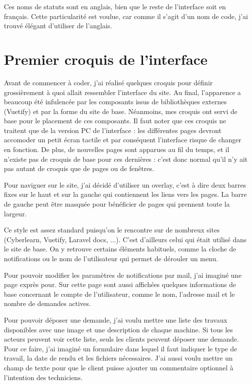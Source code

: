 \documentclass[
    iai, %
    eai, %
]{heig-tb}
\begin{document}
Ces noms de statuts sont en anglais, bien que le reste de l'interface soit en français.
Cette particularité est voulue, car comme il s'agit d'un nom de code, j'ai trouvé élégant d'utiliser de l'anglais.

\newpage
\section{Premier croquis de l'interface}
Avant de commencer à coder, j'ai réalisé quelques croquis pour définir grossièrement à quoi allait ressembler l'interface du site.
Au final, l'apparence a beaucoup été infulencée par les composants issus de bibliothèques externes (Vuetify) et par la forme du site de base.
Néanmoins, mes croquis ont servi de base pour le placement de ces composants.
Il faut noter que ces croquis ne traitent que de la version PC de l'interface : les différentes pages devront accomoder un petit écran tactile et par conséquent l'interface risque de changer en fonction.
De plus, de nouvelles pages sont apparues au fil du temps, et il n'existe pas de croquis de base pour ces dernières : c'est donc normal qu'il n'y ait pas autant de croquis que de pages ou de fenêtres.

Pour naviguer sur le site, j'ai décidé d'utiliser un overlay, c'est à dire deux barres fixes sur le haut et sur la gauche qui contiennent les liens vers les pages.
La barre de gauche peut être masquée pour bénéficier de pages qui prennent toute la largeur.


Ce style est assez standard puisqu'on le rencontre sur de nombreux sites (Cyberlearn, Vuetify, Laravel docs, ...).
C'est d'ailleurs celui qui était utilisé dans le site de base.
On y retrouve certains éléments habituels, comme la cloche de notifications ou le nom de l'utilisateur qui permet de dérouler un menu.

\newpage
Pour pouvoir modifier les paramètres de notifications par mail, j'ai imaginé une page exprès pour.
Sur cette page sont aussi affichées quelques informations de base concernant le compte de l'utilisateur, comme le nom, l'adresse mail et le nombre de demandes actives.


Pour pouvoir déposer une demande, j'ai voulu mettre une liste des travaux disponibles avec une image et une description de chaque machine.
Si tous les acteurs peuvent voir cette liste, seuls les clients peuvent déposer une demande.
Pour ce faire, j'ai imaginé un formulaire dans lequel il faut indiquer le type de travail, la date de rendu et les fichiers nécessaires.
J'ai aussi voulu mettre un champ de texte pour que le client puisse ajouter un commentaire optionnel à l'intention des techniciens.
\end{document}
